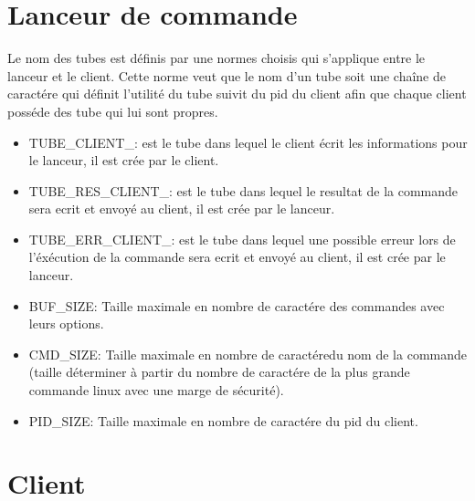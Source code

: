 \documentclass[12pt]{article}
\begin{document}
\section{Lanceur de commande}
Le nom des tubes est définis par une normes choisis qui s'applique
entre le lanceur et le client. Cette norme veut que le nom d'un tube soit une
chaîne de caractére qui
définit l'utilité du tube suivit du pid du client afin que chaque client
posséde des tube qui lui sont propres.
\begin{itemize}
  \item TUBE\_CLIENT\_: est le tube dans lequel le client écrit les
        informations
        pour le lanceur, il est crée par le client.
  \item TUBE\_RES\_CLIENT\_: est le tube dans lequel le resultat de la commande
        sera ecrit et envoyé au client, il est crée par le lanceur.
  \item TUBE\_ERR\_CLIENT\_: est le tube dans lequel une possible erreur lors
        de l'éxécution de la commande sera ecrit et envoyé au client, il est
        crée par le lanceur.
  \item BUF\_SIZE: Taille maximale en nombre de caractére des commandes avec
        leurs options.
  \item CMD\_SIZE: Taille maximale en nombre de caractéredu nom de la commande
        (taille déterminer à partir du nombre de caractére de la plus grande
        commande
        linux avec une marge de sécurité).
  \item PID\_SIZE: Taille maximale en nombre de caractére du pid du client.
\end{itemize}
\section{Client}
\end{document}
